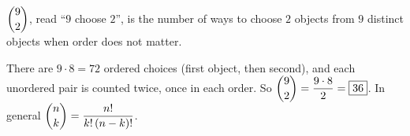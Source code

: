 $\dbinom92$, read ``$9$ choose $2$'', is the number of ways to choose $2$ objects from $9$ distinct objects when order does not matter.

There are $9\cdot8=72$ ordered choices (first object, then second), and each unordered pair is counted twice, once in each order. So $\dbinom92=\dfrac{9\cdot8}{2}=\boxed{36}$. In general $\dbinom nk=\dfrac{n!}{k!\,(n-k)!}$.

